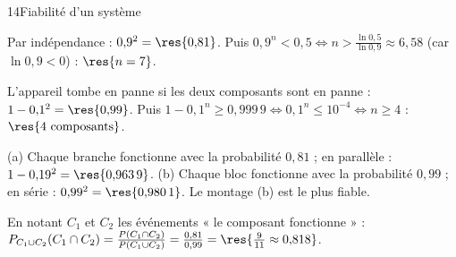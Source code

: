 \begin{corrige}{14}{Fiabilité d'un système}
\begin{questions}
  \item Par indépendance : $0{,}9^{2}=\res{0{,}81}$. Puis $0{,}9^{n}<0{,}5\iff n>\frac{\ln0{,}5}{\ln0{,}9}\approx6{,}58$ (car $\ln0{,}9<0$) :
    $\res{n=7}$.
  \item L'appareil tombe en panne si les deux composants sont en panne : $1-0{,}1^{2}=\res{0{,}99}$. Puis
    $1-0{,}1^{n}\geq0{,}999\,9\iff0{,}1^{n}\leq10^{-4}\iff n\geq4$ : $\res{4\text{ composants}}$.
  \item (a) Chaque branche fonctionne avec la probabilité $0{,}81$ ; en parallèle : $1-0{,}19^{2}=\res{0{,}963\,9}$.
    (b) Chaque bloc fonctionne avec la probabilité $0{,}99$ ; en série : $0{,}99^{2}=\res{0{,}980\,1}$. Le montage (b) est le plus fiable.
  \item En notant $C_1$ et $C_2$ les événements « le composant fonctionne » :
    $P_{C_1\cup C_2}(C_1\cap C_2)=\frac{P(C_1\cap C_2)}{P(C_1\cup C_2)}=\frac{0{,}81}{0{,}99}=\res{\frac{9}{11}\approx0{,}818}$.
\end{questions}
\end{corrige}
